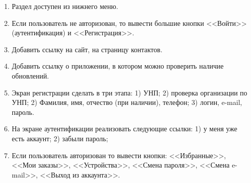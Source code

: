 \begin{enumerate}[label=\thesubsection.\arabic*, leftmargin=3cm]
    \item Раздел доступен из нижнего меню.
    \item Если пользователь не авторизован, то вывести большие кнопки <<Войти>> (аутентификация) и <<Регистрация>>.
    \item Добавить ссылку на сайт, на страницу контактов.
    \item Добавить ссылку о приложении, в котором можно проверить наличие обновлений.
    \item Экран регистрации сделать в три этапа:
    1) УНП;
    2) проверка организации по УНП;
    2) Фамилия, имя, отчество (при наличии), телефон;
    3) логин, e-mail, пароль.
    \item На экране аутентификации реализовать следующие ссылки:
    1) у меня уже есть аккаунт;
    2) забыли пароль;
    \item Если пользователь авторизован то вывести кнопки:
    <<Избранные>>,
    <<Мои заказы>>,
    <<Устройства>>,
    <<Смена пароля>>,
    <<Смена e-mail>>,
    <<Выход из аккаунта>>.
\end{enumerate}
